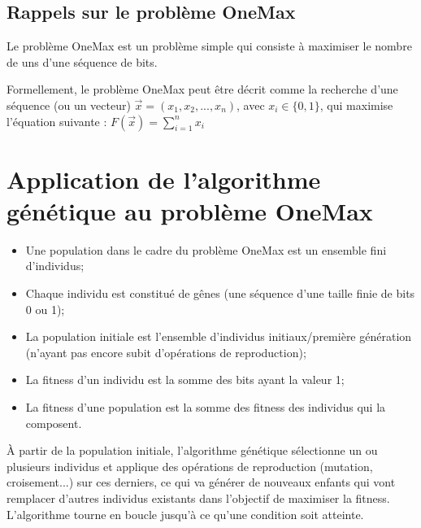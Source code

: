 \documentclass[12pt]{article}
\begin{document}
\subsection{Rappels sur le problème OneMax}
\par Le problème OneMax est un problème simple qui consiste à maximiser le nombre de uns d'une séquence de bits.
\par Formellement, le problème OneMax peut être décrit comme la recherche d'une séquence (ou un vecteur) $ \vec{x} = (x_1, x_2, ... , x_n) $, avec $ x_i \in \{0,1\} $, qui maximise l'équation suivante : $ F(\vec{x}) = \sum_{i=1}^{n} x_i $

\section{Application de l'algorithme génétique au problème OneMax}
\begin{itemize}[label=-]
\item Une population dans le cadre du problème OneMax est un ensemble fini d'individus;
\item Chaque individu est constitué de gênes (une séquence d'une taille finie de bits 0 ou 1);
\item La population initiale est l'ensemble d'individus initiaux/première génération (n'ayant pas encore subit d'opérations de reproduction);
\item La fitness d'un individu est la somme des bits ayant la valeur 1;
\item La fitness d'une population est la somme des fitness des individus qui la composent.
\end{itemize}

\par À partir de la population initiale, l'algorithme génétique sélectionne un ou plusieurs individus et applique des opérations de reproduction (mutation, croisement...) sur ces derniers, ce qui va générer de nouveaux enfants qui vont remplacer d'autres individus existants dans l'objectif de maximiser la fitness. L'algorithme tourne en boucle jusqu'à ce qu'une condition soit atteinte. 
\end{document}
